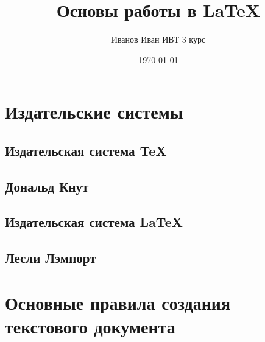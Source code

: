 \documentclass[a4paper,12pt]{article} %
\author{Иванов Иван ИВТ 3 курс}
\title{Основы работы в \LaTeX}
\date{\today}
\begin{document}
\maketitle
\newpage

\section{Издательские системы}
\subsection{Издательская система \TeX}
\subsection{Дональд Кнут}
\subsection{Издательская система \LaTeX}
\subsection{Лесли Лэмпорт}
\section{Основные правила создания текстового документа}
\end{document}
